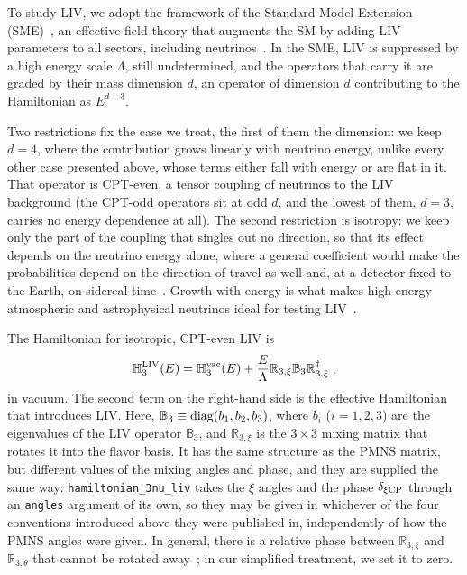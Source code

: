 \documentclass[final,5p,times,twocolumn,sort,compress]{elsarticle}
\begin{document}
To study LIV, we adopt the framework of the Standard Model Extension (SME)\ \cite{Colladay:1998fq}, an effective field theory that augments the SM by adding LIV parameters to all sectors, including neutrinos\ \cite{Coleman:1998ti, Kostelecky:2003xn, Kostelecky:2003cr, GonzalezGarcia:2004wg, Hooper:2005jp, Kostelecky:2011gq, Diaz:2014yva}.  In the SME, LIV is suppressed by a high energy scale $\Lambda$, still undetermined, and the operators that carry it are graded by their mass dimension $d$, an operator of dimension $d$ contributing to the Hamiltonian as $E^{d-3}$.  

Two restrictions fix the case we treat, the first of them the dimension: we keep $d = 4$, where the contribution grows linearly with neutrino energy, unlike every other case presented above, whose terms either fall with energy or are flat in it.  That operator is CPT-even, a tensor coupling of neutrinos to the LIV background (the CPT-odd operators sit at odd $d$, and the lowest of them, $d = 3$, carries no energy dependence at all).  The second restriction is isotropy: we keep only the part of the coupling that singles out no direction, so that its effect depends on the neutrino energy alone, where a general coefficient would make the probabilities depend on the direction of travel as well and, at a detector fixed to the Earth, on sidereal time~\cite{LSND:2005oop, MINOS:2008fnv, MINOS:2010kat, IceCube:2010fyu, MiniBooNE:2011pix, DoubleChooz:2012eiq, Telalovic:2023tcb, Telalovic:2025xor}.  Growth with energy is what makes high-energy atmospheric and astrophysical neutrinos ideal for testing LIV\ \cite{Coleman:1998ti, GonzalezGarcia:2004wg, GonzalezGarcia:2005xw, Anchordoqui:2005gj, Arguelles:2015dca, Bustamante:2015waa, Rasmussen:2017ert, Aartsen:2017ibm, Ahlers:2018mkf, Ackermann:2019cxh, IceCube:2021tdn}.

The Hamiltonian for isotropic, CPT-even LIV is\ \cite{Coleman:1998ti, Kostelecky:2003xn, Dighe:2008bu}
\begin{equation}
 \mathbb{H}_3^{\rm LIV}(E)
 =
 \mathbb{H}_3^{\rm vac}(E)
 +
 \frac{E}{\Lambda} \mathbb{R}_{3,\xi} \mathbb{B}_3 \mathbb{R}_{3,\xi}^\dagger \;,
\end{equation}
in vacuum.  The second term on the right-hand side is the effective Hamiltonian that introduces LIV.  Here, $\mathbb{B}_3 \equiv {\rm diag}(b_1, b_2, b_3)$, where $b_i$ ($i=1,2,3$) are the eigenvalues of the LIV operator $\mathbb{B}_3$, and $\mathbb{R}_{3,\xi}$ is the $3 \times 3$ mixing matrix that rotates it into the flavor basis.  It has the same structure as the PMNS matrix, but different values of the mixing angles and phase, and they are supplied the same way: {\tt hamiltonian\_3nu\_liv} takes the $\xi$ angles and the phase $\delta_{\xi{\rm CP}}$ through an {\tt angles} argument of its own, so they may be given in whichever of the four conventions introduced above they were published in, independently of how the PMNS angles were given.  In general, there is a relative phase between $\mathbb{R}_{3,\xi}$ and $\mathbb{R}_{3,\theta}$ that cannot be rotated away\ \cite{GonzalezGarcia:2004wg, GonzalezGarcia:2005xw}; in our simplified treatment, we set it to zero.
\end{document}
